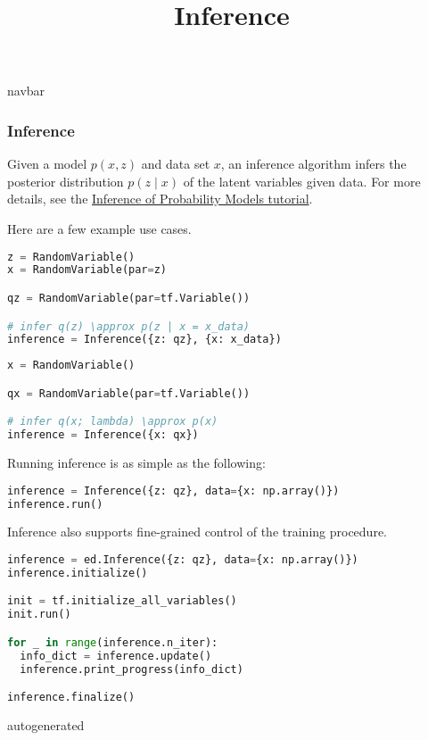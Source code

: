 \title{Inference}

{{navbar}}

\subsubsection{Inference}

Given a model $p(x, z)$ and data set $x$,
an inference algorithm infers the posterior distribution $p(z\mid x)$
of the latent variables given data. For more details, see the
\href{/tutorials/inference}
{Inference of Probability Models tutorial}.

Here are a few example use cases.
%
\begin{lstlisting}[language=Python]
z = RandomVariable()
x = RandomVariable(par=z)

qz = RandomVariable(par=tf.Variable())

# infer q(z) \approx p(z | x = x_data)
inference = Inference({z: qz}, {x: x_data})
\end{lstlisting}
\begin{lstlisting}[language=Python]
x = RandomVariable()

qx = RandomVariable(par=tf.Variable())

# infer q(x; lambda) \approx p(x)
inference = Inference({x: qx})
\end{lstlisting}
%
Running inference is as simple as the following:
\begin{lstlisting}[language=Python]
inference = Inference({z: qz}, data={x: np.array()})
inference.run()
\end{lstlisting}
%
Inference also supports fine-grained control of the training procedure.
%
\begin{lstlisting}[language=Python]
inference = ed.Inference({z: qz}, data={x: np.array()})
inference.initialize()

init = tf.initialize_all_variables()
init.run()

for _ in range(inference.n_iter):
  info_dict = inference.update()
  inference.print_progress(info_dict)

inference.finalize()
\end{lstlisting}

{{autogenerated}}
